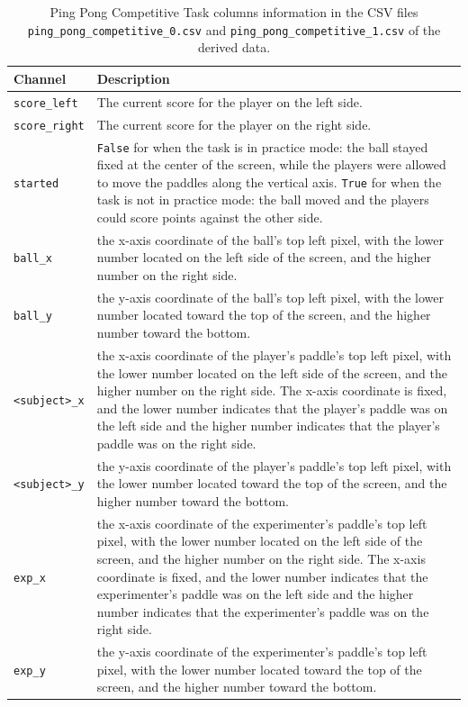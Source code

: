 \begin{table}[h]
\centering
\begin{tabularx}{\textwidth}{|l|X|}
\hline
\textbf{Channel} & \textbf{Description} \\
\hline
\texttt{score\_left} & The current score for the player on the left side.\\
\hline
\texttt{score\_right} & The current score for the player on the right side.\\
\hline
\texttt{started} & \texttt{False} for when the task is in practice mode: the ball stayed fixed at the center of the screen, while the players were allowed to move the paddles along the vertical axis. \texttt{True} for when the task is not in practice mode: the ball moved and the players could score points against the other side.\\
\hline
\texttt{ball\_x} & the x-axis coordinate of the ball's top left pixel, with the lower number located on the left side of the screen, and the higher number on the right side.\\
\hline
\texttt{ball\_y} & the y-axis coordinate of the ball's top left pixel, with the lower number located toward the top  of the screen, and the higher number toward the bottom.\\
\hline
\texttt{<subject>\_x} & the x-axis coordinate of the player's paddle's top left pixel, with the lower number located on the left side of the screen, and the higher number on the right side. The x-axis coordinate is fixed, and the lower number indicates that the player's paddle was on the left side and the higher number indicates that the player's paddle was on the right side.\\
\hline
\texttt{<subject>\_y} & the y-axis coordinate of the player's paddle's top left pixel, with the lower number located toward the top of the screen, and the higher number toward the bottom.\\
\hline
\texttt{exp\_x} & the x-axis coordinate of the experimenter's paddle's top left pixel, with the lower number located on the left side of the screen, and the higher number on the right side. The x-axis coordinate is fixed, and the lower number indicates that the experimenter's paddle was on the left side and the higher number indicates that the experimenter's paddle was on the right side.\\
\hline
\texttt{exp\_y} & the y-axis coordinate of the experimenter's paddle's top left pixel, with the lower number located toward the top of the screen, and the higher number toward the bottom.\\
\hline
\end{tabularx}
\caption{Ping Pong Competitive Task columns information in the CSV files \texttt{ping\_pong\_competitive\_0.csv} and \texttt{ping\_pong\_competitive\_1.csv} of the derived data.}
\label{tab:ping_pong_competitive_task_columns}
\end{table}


